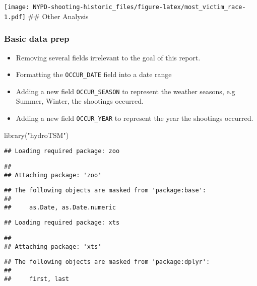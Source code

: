 \documentclass[
]{article}
\newenvironment{Shaded}{\begin{snugshade}}{\end{snugshade}}
\newcommand{\FunctionTok}[1]{\textcolor[rgb]{0.00,0.00,0.00}{#1}}
\newcommand{\NormalTok}[1]{#1}
\newcommand{\StringTok}[1]{\textcolor[rgb]{0.31,0.60,0.02}{#1}}
\providecommand{\tightlist}{%
  \setlength{\itemsep}{0pt}\setlength{\parskip}{0pt}}
\begin{document}
\texttt{[image: NYPD-shooting-historic\_files/figure-latex/most\_victim\_race-1.pdf]}
\#\# Other Analysis

\hypertarget{basic-data-prep}{%
\subsubsection{Basic data prep}\label{basic-data-prep}}

\begin{itemize}
\tightlist
\item
  Removing several fields irrelevant to the goal of this report.
\item
  Formatting the \texttt{OCCUR\_DATE} field into a date range
\item
  Adding a new field \texttt{OCCUR\_SEASON} to represent the weather
  seasons, e.g Summer, Winter, the shootings occurred.
\item
  Adding a new field \texttt{OCCUR\_YEAR} to represent the year the
  shootings occurred.
\end{itemize}

\begin{Shaded}
\begin{Highlighting}[]
\FunctionTok{library}\NormalTok{(}\StringTok{"hydroTSM"}\NormalTok{)}
\end{Highlighting}
\end{Shaded}

\begin{verbatim}
## Loading required package: zoo
\end{verbatim}

\begin{verbatim}
## 
## Attaching package: 'zoo'
\end{verbatim}

\begin{verbatim}
## The following objects are masked from 'package:base':
## 
##     as.Date, as.Date.numeric
\end{verbatim}

\begin{verbatim}
## Loading required package: xts
\end{verbatim}

\begin{verbatim}
## 
## Attaching package: 'xts'
\end{verbatim}

\begin{verbatim}
## The following objects are masked from 'package:dplyr':
## 
##     first, last
\end{verbatim}
\end{document}
